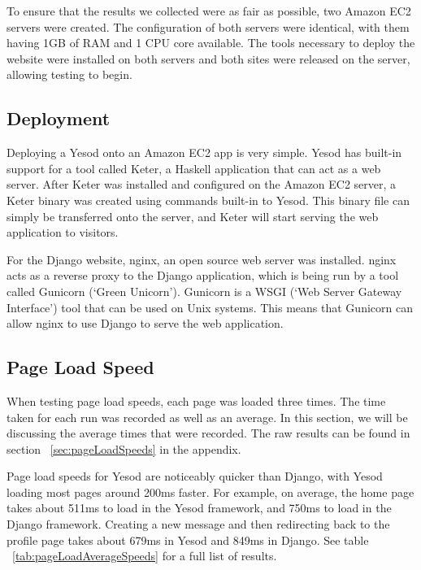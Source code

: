 To ensure that the results we collected were as fair as possible, two Amazon
EC2 servers were created. The configuration of both servers were identical,
with them having 1GB of RAM and 1 CPU core available. The tools necessary
to deploy the website were installed on both servers and both sites were
released on the server, allowing testing to begin.

\subsection{Deployment}

Deploying a Yesod onto an Amazon EC2 app is very simple. Yesod has built-in
support for a tool called Keter, a Haskell application that can act as a
web server. After Keter was installed and configured on the Amazon EC2 server,
a Keter binary was created using commands built-in to Yesod. This binary
file can simply be transferred onto the server, and Keter will start serving
the web application to visitors. \parencite[Deploying your Webapp]{yesodBook}

For the Django website, nginx, an open source web server was installed. nginx
acts as a reverse proxy to the Django application, which is being run by a tool
called Gunicorn (`Green Unicorn'). Gunicorn is a WSGI (`Web Server Gateway
Interface') tool that can be used on Unix systems. \parencite{djangoGunicorn} This means that Gunicorn
can allow nginx to use Django to serve the web application.

\subsection{Page Load Speed}
\label{sec:pageLoadSpeed}

When testing page load speeds, each page was loaded three times. The time
taken for each run was recorded as well as an average. In this section,
we will be discussing the average times that were recorded. The raw
results can be found in section ~\ref{sec:pageLoadSpeeds} in the appendix.

Page load speeds for Yesod are noticeably quicker than Django, with Yesod
loading most pages around 200ms faster. For example, on average, the home page
takes about 511ms to load in the Yesod framework, and 750ms to load in the
Django framework. Creating a new message and then redirecting back to the
profile page takes about 679ms in Yesod and 849ms in Django. See
table ~\ref{tab:pageLoadAverageSpeeds} for a full list of results.

